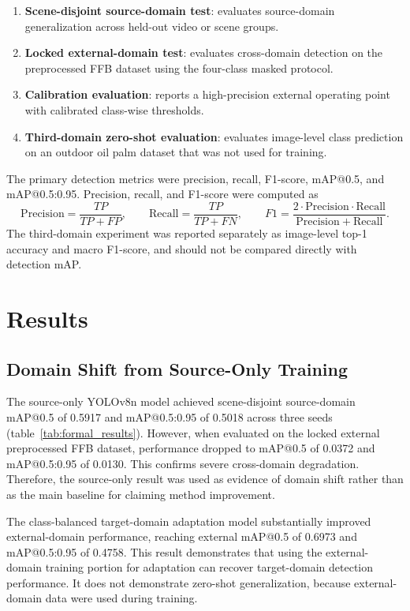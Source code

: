 ﻿\documentclass[12pt]{article}
\begin{document}
\begin{enumerate}
    \item \textbf{Scene-disjoint source-domain test}: evaluates source-domain generalization across held-out video or scene groups.
    \item \textbf{Locked external-domain test}: evaluates cross-domain detection on the preprocessed FFB dataset using the four-class masked protocol.
    \item \textbf{Calibration evaluation}: reports a high-precision external operating point with calibrated class-wise thresholds.
    \item \textbf{Third-domain zero-shot evaluation}: evaluates image-level class prediction on an outdoor oil palm dataset that was not used for training.
\end{enumerate}

The primary detection metrics were precision, recall, F1-score, mAP@0.5, and mAP@0.5:0.95. Precision, recall, and F1-score were computed as
\[
\mathrm{Precision}=\frac{TP}{TP+FP}, \qquad
\mathrm{Recall}=\frac{TP}{TP+FN}, \qquad
F1=\frac{2\cdot \mathrm{Precision}\cdot \mathrm{Recall}}
{\mathrm{Precision}+\mathrm{Recall}}.
\]
The third-domain experiment was reported separately as image-level top-1 accuracy and macro F1-score, and should not be compared directly with detection mAP.

\section{Results}

\subsection{Domain Shift from Source-Only Training}

The source-only YOLOv8n model achieved scene-disjoint source-domain mAP@0.5 of 0.5917 and mAP@0.5:0.95 of 0.5018 across three seeds (table~\ref{tab:formal_results}). However, when evaluated on the locked external preprocessed FFB dataset, performance dropped to mAP@0.5 of 0.0372 and mAP@0.5:0.95 of 0.0130. This confirms severe cross-domain degradation. Therefore, the source-only result was used as evidence of domain shift rather than as the main baseline for claiming method improvement.

The class-balanced target-domain adaptation model substantially improved external-domain performance, reaching external mAP@0.5 of 0.6973 and mAP@0.5:0.95 of 0.4758. This result demonstrates that using the external-domain training portion for adaptation can recover target-domain detection performance. It does not demonstrate zero-shot generalization, because external-domain data were used during training.
\end{document}
